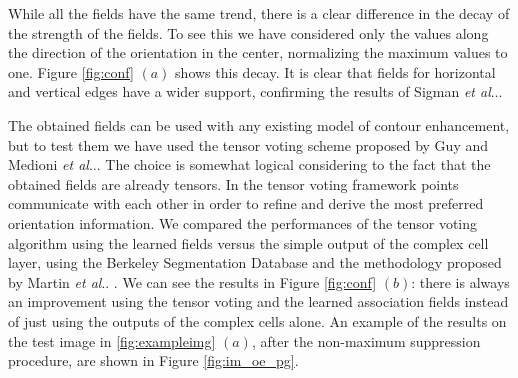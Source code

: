 \documentclass{llncs}
\makeatletter
\DeclareRobustCommand\onedot{\futurelet\@let@token\@onedot}
\def\@onedot{\ifx\@let@token.\else.\null\fi\xspace}
\def\etal{\emph{et al}\onedot}
\makeatother
\begin{document}
While all the fields have the same trend, there is a clear difference in the
decay of the strength of the fields. To see this we have considered only the
values along the direction of the orientation in the center, normalizing the
maximum values to one. Figure \ref{fig:conf} $(a)$ shows this decay.
It is clear that fields for horizontal and vertical edges have a wider support,
confirming the results of Sigman \etal \cite{Sigman01}.

The obtained fields can be used with any existing model of contour enhancement,
but to test them we have used the tensor voting scheme proposed by
Guy and Medioni \etal \cite{Guy96}. The choice is somewhat logical considering
to the fact that the obtained fields are already tensors. In the tensor voting
framework points communicate with each other in order to refine and derive the
most preferred orientation information.
We compared the performances of the tensor voting algorithm using the learned
fields versus the simple output of the complex cell layer, using the Berkeley
Segmentation Database and the methodology proposed by Martin \etal
\cite{MartinFM04,MartinFTM01}. We can see the results in Figure
\ref{fig:conf} $(b)$: there is always an improvement using the tensor voting and
the learned association fields instead of just using the outputs of
the complex cells alone. An example of the results on the test image in
\ref{fig:exampleimg} $(a)$, after the non-maximum suppression procedure, are
shown in Figure \ref{fig:im_oe_pg}.

\end{document}
